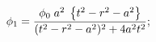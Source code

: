 \begin{equation}
\phi_1 = {\phi_0 \; a^2  \;
\left\{ t^2-r^2-a^2 \right\}
\over
(t^2-r^2-a^2)^2 +
4 a^2 t^2};
\end{equation}

